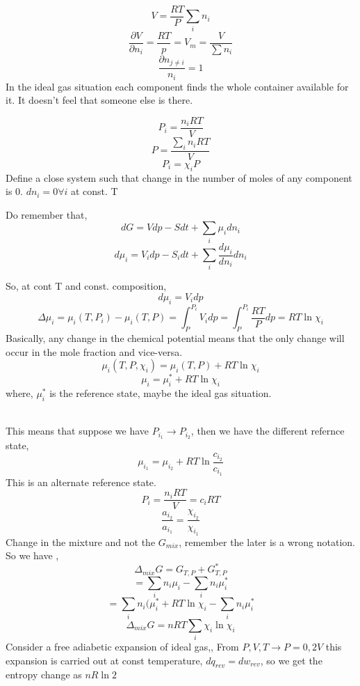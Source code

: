 \documentclass{article}
\theoremstyle{definition}
\begin{document}
\[
V = \frac{RT}{P} \sum_i n_i 
\]
\[
\frac{\partial V}{\partial n_i } = \frac{RT}{p}= V_m = \frac{V}{\sum n_i}

\]
\[
\frac{\partial n_{j \neq i}}{n_i}= 1
\]
In the ideal gas situation each component finds the whole container available for it. It doesn't feel that someone else is there. 

\[
P_i = \frac{n_i RT}{V}
\]
\[
P = \frac{\sum_i n_i RT}{V}
\]
\[
P_i = \chi_i P
\]
Define a close system such that change in the number of moles of any component is 0. $dn_i = 0 \forall i$ at const. T

Do remember that, 
\[
dG = Vdp -Sdt + \sum_i \mu_idn_i
\]
\[
d\mu_i = V_idp -S_idt + \sum_i \frac{d\mu_i}{dn_i}dn_i
\]
\begin{center}
    

\end{center}
So, at cont T and const. composition,
\[
d\mu_i = V_i dp
\]
\[
\Delta \mu_i = \mu_i (T, P_i) - \mu_i(T,P) = \int_P^{P_i} V_idp = \int_P^{P_i} \frac{RT}{P} dp = RT \ln{\chi_i}
\]
Basically, any change in the chemical potential means that the only change will occur in the mole fraction and vice-versa.
\[
\mu_i (T,P, \chi_i) = \mu_i(T,P) + RT\ln{\chi_i}
\]
\[
\mu_i = \mu_i^* + RT\ln{\chi_i}
\]
where, $\mu_i^*$ is the reference state, maybe the ideal gas situation. 

\\
This means that suppose we have $P_{i_1} \rightarrow P_{i_2}$, then we have the different refernce state,
\[
\mu_{i_1}  = \mu_{i_2} + RT\ln{\frac{c_{i_2}}{c_{i_1}}}
\]
This is an alternate reference state.
\[
P_i = \frac{n_iRT}{V} = c_iRT
\]
\[
\frac{a_{i_2}}{a_{i_1}} = \frac{\chi_{i_2}}{\chi_{i_1}}
\]
Change in the mixture and not the $G_{mix}$, remember the later is a wrong notation.
So we have ,
\[
\Delta_{mix} G = G_{T,P} +  G_{T,P}^*

\]
\[
= \sum_i n_i\mu_i - \sum_in_i\mu_i^*
\]
\[
= \sum_i n_i(\mu_i^* + RT\ln{\chi_i} - \sum_in_i\mu_i^*
\]
\[
 \Delta_{mix} G = nRT\sum_i \chi_i\ln{\chi_i}
\]
Consider a free adiabetic expansion of ideal gas,,
From $P,V,T \rightarrow P=0, 2V$ this expansion is carried out at const temperature, $dq_{rev} = dw_{rev}$, so we get the entropy change as $nR\ln{2}$
\end{document}
